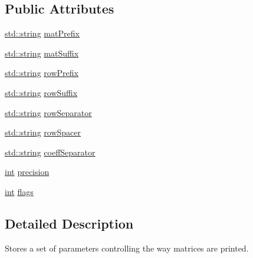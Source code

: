 \subsection*{Public Attributes}
\begin{DoxyCompactItemize}
\item 
\hyperlink{glext_8h_aa81bcd27b2208041814b4beacb88c2d9}{std\-::string} \hyperlink{struct_i_o_format_a202a95197749003cfc1083a4d8e83644}{mat\-Prefix}
\item 
\hyperlink{glext_8h_aa81bcd27b2208041814b4beacb88c2d9}{std\-::string} \hyperlink{struct_i_o_format_ae219f4769d6e9fd74801082703dc8c1e}{mat\-Suffix}
\item 
\hyperlink{glext_8h_aa81bcd27b2208041814b4beacb88c2d9}{std\-::string} \hyperlink{struct_i_o_format_a8d61a2cb39077ec5b75240fa94d0310a}{row\-Prefix}
\item 
\hyperlink{glext_8h_aa81bcd27b2208041814b4beacb88c2d9}{std\-::string} \hyperlink{struct_i_o_format_ab060e31456bd9f07a388cfae379323a2}{row\-Suffix}
\item 
\hyperlink{glext_8h_aa81bcd27b2208041814b4beacb88c2d9}{std\-::string} \hyperlink{struct_i_o_format_ac81a4fba783004fe55fab9dbce357a4e}{row\-Separator}
\item 
\hyperlink{glext_8h_aa81bcd27b2208041814b4beacb88c2d9}{std\-::string} \hyperlink{struct_i_o_format_a8cba2479446a22046569fc30a7892439}{row\-Spacer}
\item 
\hyperlink{glext_8h_aa81bcd27b2208041814b4beacb88c2d9}{std\-::string} \hyperlink{struct_i_o_format_aed1ba9fe690e73e7b39ba3d2a517ccd2}{coeff\-Separator}
\item 
\hyperlink{ioapi_8h_a787fa3cf048117ba7123753c1e74fcd6}{int} \hyperlink{struct_i_o_format_ab10b51d07aeca6aa3ae6a3580935f847}{precision}
\item 
\hyperlink{ioapi_8h_a787fa3cf048117ba7123753c1e74fcd6}{int} \hyperlink{struct_i_o_format_a61ae3fca33b41127e48a0e86aed5465b}{flags}
\end{DoxyCompactItemize}


\subsection{Detailed Description}
Stores a set of parameters controlling the way matrices are printed. 

